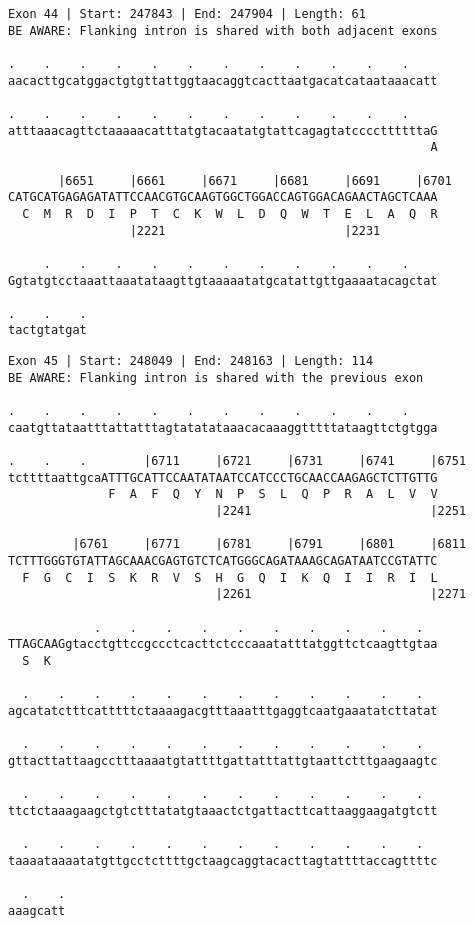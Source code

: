 \documentclass{article}
\begin{document}
\begin{Verbatim}
Exon 44 | Start: 247843 | End: 247904 | Length: 61
BE AWARE: Flanking intron is shared with both adjacent exons
 
.    .    .    .    .    .    .    .    .    .    .    .    
aacacttgcatggactgtgttattggtaacaggtcacttaatgacatcataataaacatt
  
.    .    .    .    .    .    .    .    .    .    .    .    
atttaaacagttctaaaaacatttatgtacaatatgtattcagagtatccccttttttaG
                                                           A
  
       |6651     |6661     |6671     |6681     |6691     |6701
CATGCATGAGAGATATTCCAACGTGCAAGTGGCTGGACCAGTGGACAGAACTAGCTCAAA
  C  M  R  D  I  P  T  C  K  W  L  D  Q  W  T  E  L  A  Q  R
                 |2221                         |2231        
  
     .    .    .    .    .    .    .    .    .    .    .    
Ggtatgtcctaaattaaatataagttgtaaaaatatgcatattgttgaaaatacagctat
  
.    .    .
tactgtatgat
\end{Verbatim}
\newpage
\begin{Verbatim}
Exon 45 | Start: 248049 | End: 248163 | Length: 114
BE AWARE: Flanking intron is shared with the previous exon
 
.    .    .    .    .    .    .    .    .    .    .    .    
caatgttataatttattatttagtatatataaacacaaaggtttttataagttctgtgga
  
.    .    .        |6711     |6721     |6731     |6741     |6751
tcttttaattgcaATTTGCATTCCAATATAATCCATCCCTGCAACCAAGAGCTCTTGTTG
              F  A  F  Q  Y  N  P  S  L  Q  P  R  A  L  V  V
                             |2241                         |2251
  
         |6761     |6771     |6781     |6791     |6801     |6811
TCTTTGGGTGTATTAGCAAACGAGTGTCTCATGGGCAGATAAAGCAGATAATCCGTATTC
  F  G  C  I  S  K  R  V  S  H  G  Q  I  K  Q  I  I  R  I  L
                             |2261                         |2271
  
            .    .    .    .    .    .    .    .    .    .  
TTAGCAAGgtacctgttccgccctcacttctcccaaatatttatggttctcaagttgtaa
  S  K                                                      
  
  .    .    .    .    .    .    .    .    .    .    .    .  
agcatatctttcatttttctaaaagacgtttaaatttgaggtcaatgaaatatcttatat
  
  .    .    .    .    .    .    .    .    .    .    .    .  
gttacttattaagcctttaaaatgtattttgattatttattgtaattctttgaagaagtc
  
  .    .    .    .    .    .    .    .    .    .    .    .  
ttctctaaagaagctgtctttatatgtaaactctgattacttcattaaggaagatgtctt
  
  .    .    .    .    .    .    .    .    .    .    .    .  
taaaataaaatatgttgcctcttttgctaagcaggtacacttagtattttaccagttttc
  
  .    .
aaagcatt
\end{Verbatim}
\end{document}
